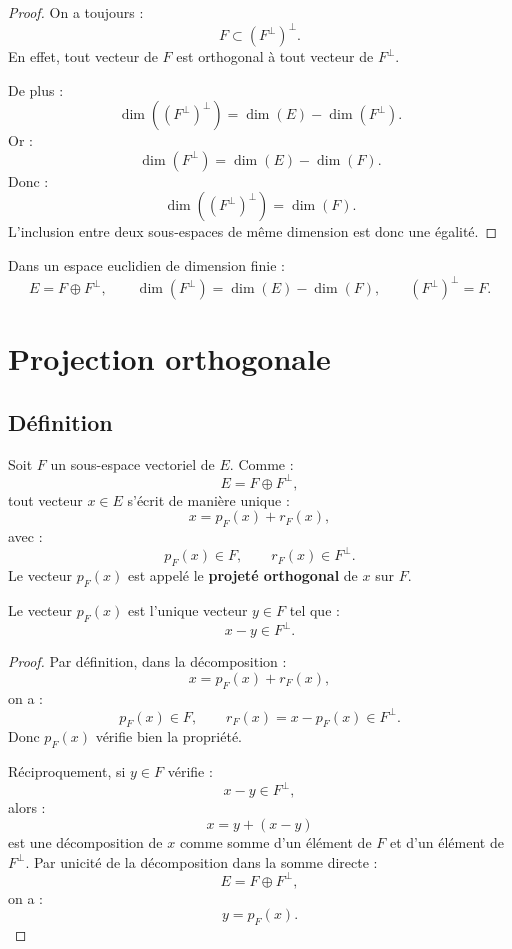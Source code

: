 \documentclass[11pt,a4paper]{article}
\begin{document}
\begin{proof}
On a toujours :
\[
F\subset (F^\perp)^\perp.
\]
En effet, tout vecteur de \(F\) est orthogonal à tout vecteur de \(F^\perp\).

De plus :
\[
\dim((F^\perp)^\perp)
=
\dim(E)-\dim(F^\perp).
\]
Or :
\[
\dim(F^\perp)=\dim(E)-\dim(F).
\]
Donc :
\[
\dim((F^\perp)^\perp)=\dim(F).
\]
L'inclusion entre deux sous-espaces de même dimension est donc une égalité.
\end{proof}

\begin{retenirbox}
Dans un espace euclidien de dimension finie :
\[
E=F\oplus F^\perp,
\qquad
\dim(F^\perp)=\dim(E)-\dim(F),
\qquad
(F^\perp)^\perp=F.
\]
\end{retenirbox}

\section{Projection orthogonale}

\subsection{Définition}

\begin{definitionbox}
Soit \(F\) un sous-espace vectoriel de \(E\).  
Comme :
\[
E=F\oplus F^\perp,
\]
tout vecteur \(x\in E\) s'écrit de manière unique :
\[
x=p_F(x)+r_F(x),
\]
avec :
\[
p_F(x)\in F,
\qquad
r_F(x)\in F^\perp.
\]
Le vecteur \(p_F(x)\) est appelé le \textbf{projeté orthogonal} de \(x\) sur \(F\).
\end{definitionbox}

\begin{theorembox}
Le vecteur \(p_F(x)\) est l'unique vecteur \(y\in F\) tel que :
\[
x-y\in F^\perp.
\]
\end{theorembox}

\begin{proof}
Par définition, dans la décomposition :
\[
x=p_F(x)+r_F(x),
\]
on a :
\[
p_F(x)\in F,
\qquad
r_F(x)=x-p_F(x)\in F^\perp.
\]
Donc \(p_F(x)\) vérifie bien la propriété.

Réciproquement, si \(y\in F\) vérifie :
\[
x-y\in F^\perp,
\]
alors :
\[
x=y+(x-y)
\]
est une décomposition de \(x\) comme somme d'un élément de \(F\) et d'un élément de \(F^\perp\).  
Par unicité de la décomposition dans la somme directe :
\[
E=F\oplus F^\perp,
\]
on a :
\[
y=p_F(x).
\]
\end{proof}
\end{document}
